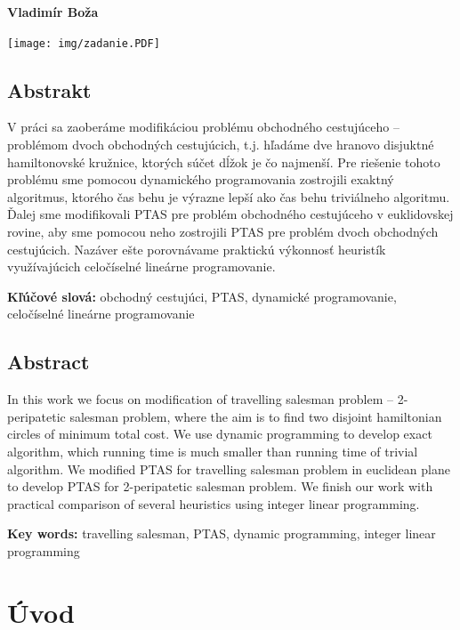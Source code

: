 \documentclass[12pt,a4paper]{book}
\begin{document}
\hfill{\bf Vladimír Boža}
\eject %

\thispagestyle{empty}
\texttt{[image: img/zadanie.PDF]}
\eject
\restoregeometry

\thispagestyle{empty}

\section*{Abstrakt}

V práci sa zaoberáme modifikáciou problému obchodného cestujúceho --
problémom dvoch obchodných cestujúcich, t.j. hľadáme dve hranovo
disjuktné hamiltonovské kružnice, ktorých súčet dĺžok je čo najmenší.
Pre riešenie tohoto problému sme pomocou dynamického programovania
zostrojili exaktný algoritmus, ktorého čas behu je výrazne lepší ako
čas behu triviálneho algoritmu. Ďalej sme modifikovali PTAS pre problém
obchodného cestujúceho v euklidovskej rovine, aby sme pomocou neho zostrojili PTAS pre
problém dvoch obchodných cestujúcich.
Nazáver ešte porovnávame praktickú výkonnosť heuristík využívajúcich
celočíselné lineárne programovanie. 

\medskip
{\bf Kľúčové slová:} obchodný cestujúci, PTAS, dynamické programovanie, celočíselné
lineárne programovanie
\eject

\thispagestyle{empty}

\section*{Abstract}

In this work we focus on modification of travelling salesman problem --
2-peripatetic salesman problem, where the aim is to find two disjoint
hamiltonian circles of minimum total cost.
We use dynamic programming to develop exact algorithm, which running time is
much smaller than running time of trivial algorithm. We modified PTAS for
travelling salesman problem in euclidean plane to develop PTAS for
2-peripatetic salesman problem. 
We finish our work with practical comparison of several heuristics
using integer linear programming.

\medskip
{\bf Key words:} travelling salesman, PTAS, dynamic programming,
integer linear programming
\eject

\thispagestyle{empty}
\tableofcontents
\thispagestyle{empty}

\setcounter{page}{0}
\chapter*{Úvod}
\label{chapter:uvod}

\end{document}
